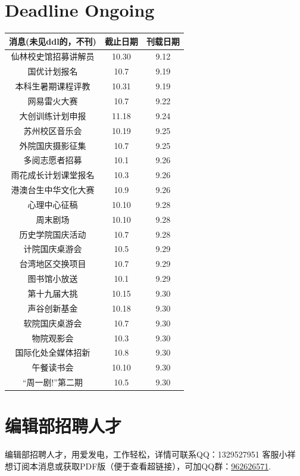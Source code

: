 \documentclass[letterpaper, 12pt]{article}
\begin{document}
\begin{multicols}{2}

\section{Deadline Ongoing}
\begin{tabular}{|c|c|c|}
    \hline
    消息(未见ddl的，不刊) & 截止日期 & 刊载日期\\
    \hline\hline
    仙林校史馆招募讲解员 & 10.30 & 9.12\\
    国优计划报名 & 10.7 & 9.19\\
    本科生暑期课程评教 & 10.31 & 9.19\\
    网易雷火大赛 & 10.7 & 9.22\\
    大创训练计划申报 & 11.18 & 9.24\\
    苏州校区音乐会 & 10.19 & 9.25\\
    外院国庆摄影征集 & 10.7 & 9.25\\
    多阅志愿者招募 & 10.1 & 9.26\\
    雨花成长计划课堂报名 & 10.3 & 9.26\\
    港澳台生中华文化大赛 & 10.9 & 9.26\\
    心理中心征稿 & 10.10 & 9.28\\
    周末剧场 & 10.10 & 9.28\\
    历史学院国庆活动 & 10.7 & 9.28\\
    计院国庆桌游会 & 10.5 & 9.29\\
    台湾地区交换项目 & 10.7 & 9.29\\
    图书馆小放送 & 10.1 & 9.29\\
    第十九届大挑 & 10.15 & 9.30\\
    声谷创新基金 & 10.18 & 9.30\\
    软院国庆桌游会 & 10.7 & 9.30\\
    物院观影会 & 10.3 & 9.30\\
    国际化处全媒体招新 & 10.8 & 9.30\\
    午餐读书会 & 10.10 & 9.30\\
    “周一剧!”第二期 & 10.5 & 9.30\\
    \hline
\end{tabular}
\section{编辑部招聘人才}
编辑部招聘人才，用爱发电，工作轻松，详情可联系QQ：1329527951 客服小祥\\想订阅本消息或获取PDF版（便于查看超链接），可加QQ群：\href{https://qm.qq.com/q/FGX1VYCrGS}{962626571}.

\end{multicols}
\end{document}
